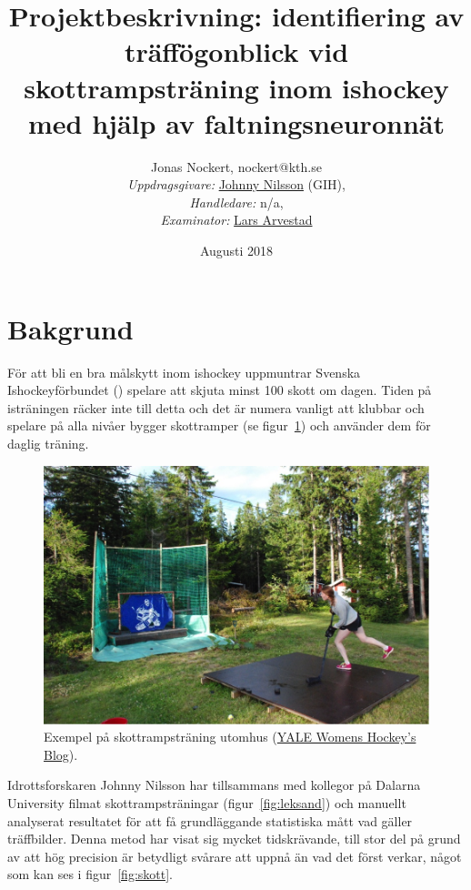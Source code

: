 \documentclass[a4paper,12pt]{article}
\title{Projektbeskrivning: identifiering av träffögonblick vid
  skottrampsträning inom ishockey med hjälp av faltningsneuronnät}
\author{Jonas Nockert, nockert@kth.se
  \\[0.5cm]
    \small \textit{Uppdragsgivare:}
    \href{http://www.gih.se/Personal/Johnny-Nilsson/} {Johnny Nilsson} (GIH),\\
    \small \textit{Handledare:}
    n/a,\\
    \small \textit{Examinator:}
    \href{http://staff.math.su.se/arve/} {Lars Arvestad}
}
\date{\small Augusti 2018}
\begin{document}
\maketitle

\section*{Bakgrund}
För att bli en bra målskytt inom ishockey uppmuntrar Svenska Ishockeyförbundet
(\citeyear{Swehockey:2016}) spelare att skjuta minst 100 skott om dagen. Tiden
på isträningen räcker inte till detta och det är numera vanligt att klubbar
och spelare på alla nivåer bygger skottramper (se figur~\ref{fig:skottramp})
och använder dem för daglig träning.

\begin{figure}[ht]
  \centering
  \includegraphics[width=\linewidth]{photos/the-incredible-shooting-ramp-my-mom-built-for-me.png}
  \caption{Exempel på skottrampsträning utomhus
  (\href{https://yalewomenshockey.wordpress.com/2013/07/18/ywih-summer-blog-hanna-astrom/}{YALE Womens Hockey's Blog}).
  \label{fig:skottramp}}
\end{figure}

Idrottsforskaren Johnny Nilsson har tillsammans med kollegor på Dalarna
University filmat skottrampsträningar (figur~\ref{fig:leksand}) och manuellt
analyserat resultatet för att få grundläggande statistiska mått vad gäller
träffbilder. Denna metod har visat sig mycket tidskrävande, till stor del
på grund av att hög precision är betydligt svårare att uppnå än vad det först
verkar, något som kan ses i figur~\ref{fig:skott}.
\end{document}
